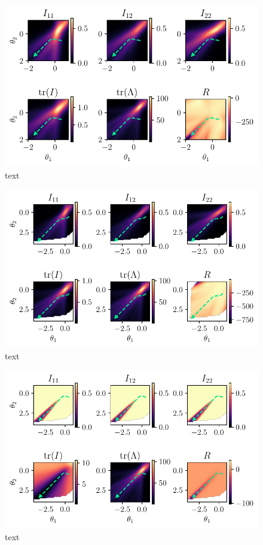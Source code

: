 \begin{figure}
	\centering
	\includegraphics{Experiment2/plots/MeanPowerLoss2_tracecomparison.pdf}
	\caption{text}
\end{figure}

\begin{figure}
	\centering
	\includegraphics{Experiment2/plots/LPNormLoss2_tracecomparison.pdf}
	\caption{text}
\end{figure}

\begin{figure}
	\centering
	\includegraphics{Experiment2/plots/CrossEntropyLoss_tracecomparison.pdf}
	\caption{text}
\end{figure}